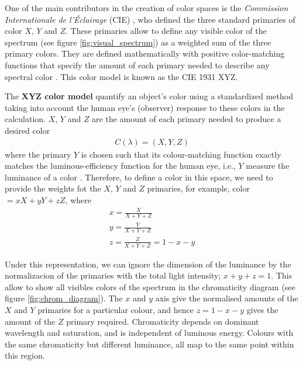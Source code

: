 One of the main contributors in the creation of color spaces is the \textit{Commission Internationale de l'Éclairage} (CIE) \citep{CIE:Journal:1932}, who defined the three standard primaries of color $X$, $Y$ and $Z$. These primaries allow to define any visible color of the spectrum (see figure \ref{fig:visual_spectrum}) as a weighted sum of the three primary colors. They are defined mathematically with positive color-matching functions that specify the amount of each primary needed to describe any spectral color \citep{Wright:BookCh2:2007}. This color model is known as the CIE 1931 XYZ.

The \textbf{XYZ color model} quantify an object’s color using a standardized method taking into account the human eye’s (observer) response to these colors in the calculation. $X$, $Y$ and $Z$ are the amount of each primary needed to produce a desired color
\begin{eqnarray} 
 C(\lambda) = (X,Y,Z) \label{eq:XYZ_color}
\end{eqnarray}
where the primary $Y$ is chosen such that its colour-matching function exactly matches the luminous-efficiency function for the human eye, i.e., $Y$ measure the luminance of a color \citep{Wright:BookCh2:2007}. Therefore, to define a color in this space, we need to provide the weights fot the $X$, $Y$ and $Z$ primaries, for example, color $=xX + yY + zZ$, where 
\begin{eqnarray} 
	x = \frac{X}{X+Y+Z} \\
	y = \frac{Y}{X+Y+Z} \\ 
	z = \frac{Z}{X+Y+Z} = 1-x-y \label{eq:xyz_color_coords}
\end{eqnarray}

Under this representation, we can ignore the dimension of the luminance by the normalizacion of the primaries with the total light intensity; $x+y+z=1$. This allow to show all visibles colors of the spectrum in the chromaticity diagram (see figure \ref{fig:chrom_diagram}). The $x$ and $y$ axis give the normalised amounts of the $X$ and $Y$ primaries for a particular colour, and hence $z = 1 - x - y$ gives the amount of the $Z$ primary required. Chromaticity depends on dominant wavelength and saturation, and is independent of luminous energy. Colours with the same chromaticity but different luminance, all map to the same point within this region.

